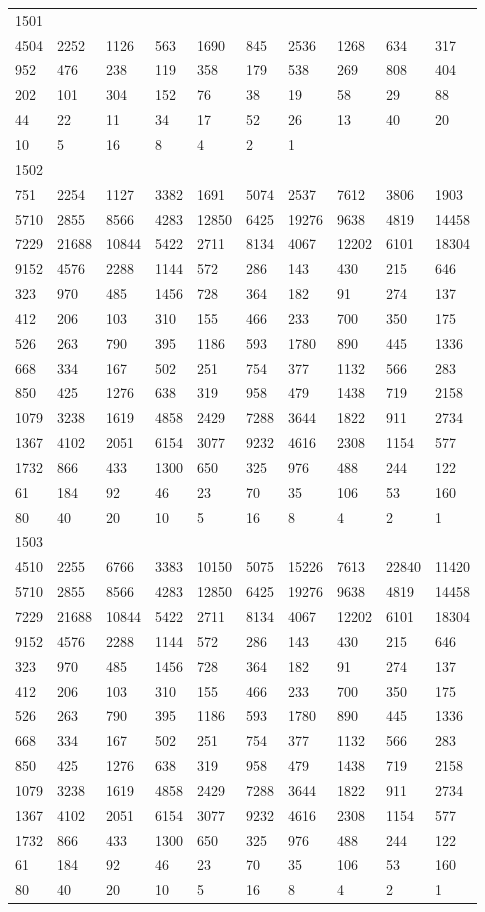 \begin{longtable}{*{10}{l}}
1501&&&&&&&&&\\
4504& 2252& 1126& 563& 1690& 845& 2536& 1268& 634& 317\\
952& 476& 238& 119& 358& 179& 538& 269& 808& 404\\
202& 101& 304& 152& 76& 38& 19& 58& 29& 88\\
44& 22& 11& 34& 17& 52& 26& 13& 40& 20\\
10& 5& 16& 8& 4& 2& 1& \\

1502&&&&&&&&&\\
751& 2254& 1127& 3382& 1691& 5074& 2537& 7612& 3806& 1903\\
5710& 2855& 8566& 4283& 12850& 6425& 19276& 9638& 4819& 14458\\
7229& 21688& 10844& 5422& 2711& 8134& 4067& 12202& 6101& 18304\\
9152& 4576& 2288& 1144& 572& 286& 143& 430& 215& 646\\
323& 970& 485& 1456& 728& 364& 182& 91& 274& 137\\
412& 206& 103& 310& 155& 466& 233& 700& 350& 175\\
526& 263& 790& 395& 1186& 593& 1780& 890& 445& 1336\\
668& 334& 167& 502& 251& 754& 377& 1132& 566& 283\\
850& 425& 1276& 638& 319& 958& 479& 1438& 719& 2158\\
1079& 3238& 1619& 4858& 2429& 7288& 3644& 1822& 911& 2734\\
1367& 4102& 2051& 6154& 3077& 9232& 4616& 2308& 1154& 577\\
1732& 866& 433& 1300& 650& 325& 976& 488& 244& 122\\
61& 184& 92& 46& 23& 70& 35& 106& 53& 160\\
80& 40& 20& 10& 5& 16& 8& 4& 2& 1\\

1503&&&&&&&&&\\
4510& 2255& 6766& 3383& 10150& 5075& 15226& 7613& 22840& 11420\\
5710& 2855& 8566& 4283& 12850& 6425& 19276& 9638& 4819& 14458\\
7229& 21688& 10844& 5422& 2711& 8134& 4067& 12202& 6101& 18304\\
9152& 4576& 2288& 1144& 572& 286& 143& 430& 215& 646\\
323& 970& 485& 1456& 728& 364& 182& 91& 274& 137\\
412& 206& 103& 310& 155& 466& 233& 700& 350& 175\\
526& 263& 790& 395& 1186& 593& 1780& 890& 445& 1336\\
668& 334& 167& 502& 251& 754& 377& 1132& 566& 283\\
850& 425& 1276& 638& 319& 958& 479& 1438& 719& 2158\\
1079& 3238& 1619& 4858& 2429& 7288& 3644& 1822& 911& 2734\\
1367& 4102& 2051& 6154& 3077& 9232& 4616& 2308& 1154& 577\\
1732& 866& 433& 1300& 650& 325& 976& 488& 244& 122\\
61& 184& 92& 46& 23& 70& 35& 106& 53& 160\\
80& 40& 20& 10& 5& 16& 8& 4& 2& 1\\


\end{longtable}
